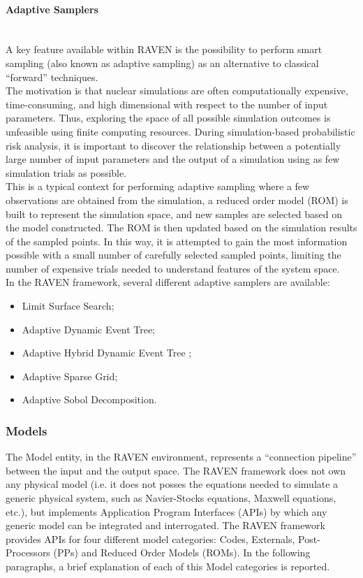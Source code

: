 \paragraph{Adaptive Samplers}~\\
A key feature available within RAVEN is the possibility to perform smart sampling (also known as adaptive sampling) as an alternative to classical ``forward'' techniques.
\\The motivation is that nuclear simulations are often computationally expensive, time-consuming, and high dimensional with respect to the number of input parameters. Thus, exploring the space of all possible simulation outcomes is unfeasible using finite computing resources. During simulation-based probabilistic risk analysis, it is important to discover the relationship between a potentially large number of input parameters and the output of a simulation using as few simulation trials as possible.
\\This is a typical context for performing adaptive sampling where a few observations are obtained from the simulation, a reduced order model (ROM) is built to represent the simulation space, and new samples are selected based on the model constructed. The ROM is then updated based on the simulation results of the sampled points. In this way, it is attempted to gain the most information possible with a small number of carefully selected sampled points, limiting the number of expensive trials needed to understand features of the system space.
\\In the RAVEN framework, several different adaptive samplers are available:
\begin{itemize}
\item Limit Surface Search;
\item Adaptive Dynamic Event Tree;
\item Adaptive Hybrid Dynamic Event Tree ;
\item Adaptive Sparse Grid;
\item Adaptive Sobol Decomposition.
\end{itemize}

\subsubsection{Models}
The Model entity, in the RAVEN environment, represents a ``connection pipeline'' between the input and the output space. The RAVEN framework does not own any physical model (i.e. it does not posses the equations needed to simulate a generic physical system, such as Navier-Stocks equations, Maxwell equations, etc.), but implements Application Program Interfaces (APIs) by which any generic model can be integrated and interrogated. The RAVEN framework provides APIs for four different model categories: Codes, Externals, Post-Processors (PPs) and Reduced Order Models (ROMs). In the following paragraphs, a brief explanation of each of this Model categories is reported.
